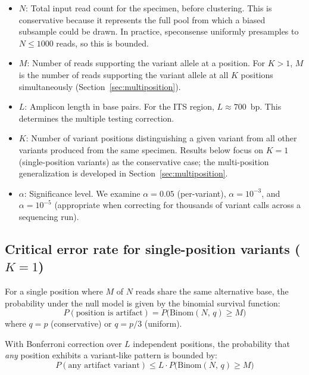 \documentclass[11pt]{article}
\begin{document}
\begin{itemize}
\item $N$: Total input read count for the specimen, before clustering. This is
conservative because it represents the full pool from which a biased subsample
could be drawn. In practice, speconsense uniformly presamples to $N \leq 1000$
reads, so this is bounded.

\item $M$: Number of reads supporting the variant allele at a position. For
$K > 1$, $M$ is the number of reads supporting the variant allele at all $K$
positions simultaneously (Section~\ref{sec:multiposition}).

\item $L$: Amplicon length in base pairs. For the ITS region, $L \approx 700$~bp.
This determines the multiple testing correction.

\item $K$: Number of variant positions distinguishing a given variant from all
other variants produced from the same specimen. Results below focus on
$K = 1$ (single-position variants) as the conservative case; the multi-position
generalization is developed in Section~\ref{sec:multiposition}.

\item $\alpha$: Significance level. We examine $\alpha = 0.05$ (per-variant),
$\alpha = 10^{-3}$, and $\alpha = 10^{-5}$ (appropriate when correcting for
thousands of variant calls across a sequencing run).
\end{itemize}

\subsection{Critical error rate for single-position variants ($K = 1$)}

For a single position where $M$ of $N$ reads share the same alternative base,
the probability under the null model is given by the binomial survival function:
\begin{equation}
P(\text{position is artifact}) = P\bigl(\text{Binom}(N,\, q) \geq M\bigr)
\end{equation}
where $q = p$ (conservative) or $q = p/3$ (uniform).

With Bonferroni correction over $L$ independent positions, the probability that
\emph{any} position exhibits a variant-like pattern is bounded by:
\begin{equation}
P(\text{any artifact variant}) \leq L \cdot P\bigl(\text{Binom}(N,\, q) \geq M\bigr)
\end{equation}
\end{document}
